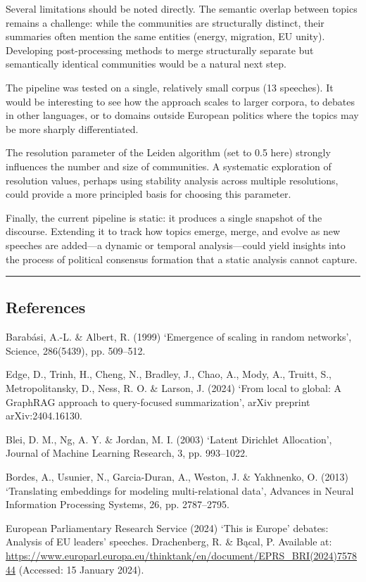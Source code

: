 \documentclass[11pt]{article}
\begin{document}
Several limitations should be noted directly. The semantic overlap between topics remains a challenge: while the communities are structurally distinct, their summaries often mention the same entities (energy, migration, EU unity). Developing post-processing methods to merge structurally separate but semantically identical communities would be a natural next step.

The pipeline was tested on a single, relatively small corpus (13 speeches). It would be interesting to see how the approach scales to larger corpora, to debates in other languages, or to domains outside European politics where the topics may be more sharply differentiated.

The resolution parameter of the Leiden algorithm (set to 0.5 here) strongly influences the number and size of communities. A systematic exploration of resolution values, perhaps using stability analysis across multiple resolutions, could provide a more principled basis for choosing this parameter.

Finally, the current pipeline is static: it produces a single snapshot of the discourse. Extending it to track how topics emerge, merge, and evolve as new speeches are added---a dynamic or temporal analysis---could yield insights into the process of political consensus formation that a static analysis cannot capture.


\hrule


\subsection{References}


Barab\'{a}si, A.-L. \& Albert, R. (1999) `Emergence of scaling in random networks', Science, 286(5439), pp. 509--512.


Edge, D., Trinh, H., Cheng, N., Bradley, J., Chao, A., Mody, A., Truitt, S., Metropolitansky, D., Ness, R. O. \& Larson, J. (2024) `From local to global: A GraphRAG approach to query-focused summarization', arXiv preprint arXiv:2404.16130.


Blei, D. M., Ng, A. Y. \& Jordan, M. I. (2003) `Latent Dirichlet Allocation', Journal of Machine Learning Research, 3, pp. 993--1022.


Bordes, A., Usunier, N., Garcia-Duran, A., Weston, J. \& Yakhnenko, O. (2013) `Translating embeddings for modeling multi-relational data', Advances in Neural Information Processing Systems, 26, pp. 2787--2795.


European Parliamentary Research Service (2024) `This is Europe' debates: Analysis of EU leaders' speeches. Drachenberg, R. \& B\k{a}cal, P. Available at: \url{https://www.europarl.europa.eu/thinktank/en/document/EPRS\_BRI(2024)757844} (Accessed: 15 January 2024).
\end{document}
